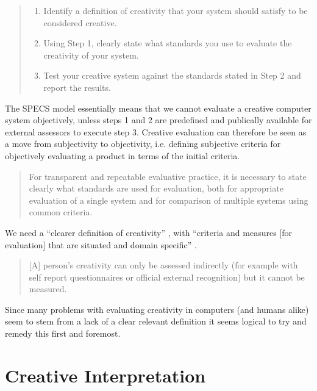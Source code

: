 \begin{quote}
  \begin{enumerate}
    \item Identify a definition of creativity that your system should satisfy to be considered creative.
    \item Using Step 1, clearly state what standards you use to evaluate the creativity of your system.
    \item Test your creative system against the standards stated in Step 2 and report the results.
  \end{enumerate}
\end{quote}

The \ac{SPECS} model essentially means that we cannot evaluate a creative computer system objectively, unless steps 1 and 2 are predefined and publically available for external assessors to execute step 3. Creative evaluation can therefore be seen as a move from subjectivity to objectivity, i.e. defining subjective criteria for objectively evaluating a product in terms of the initial criteria.

\begin{quotation}
  For transparent and repeatable evaluative practice, it is necessary to state clearly what standards are used for evaluation, both for appropriate evaluation of a single system and for comparison of multiple systems using common criteria. 
\end{quotation}

We need a ``clearer definition of creativity'' \autocite{Mayer1999}, with ``criteria and measures [for evaluation] that are situated and domain specific'' \autocite{Candy2012}.

\begin{quotation}
  [A] person's creativity can only be assessed indirectly (for example with self report questionnaires or official external recognition) but it cannot be measured. 
\end{quotation}

Since many problems with evaluating creativity in computers (and humans alike) seem to stem from a lack of a clear relevant definition it seems logical to try and remedy this first and foremost.


\section{Creative Interpretation}
\label{s:creatint}

